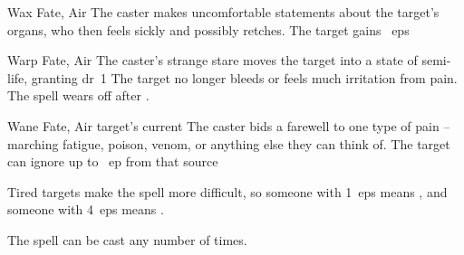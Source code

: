 \ifodd\value{diceNo}
  {}%
  {Wax}%
  {Fate, Air}%
  {}%
  {The caster makes uncomfortable statements about the target's organs, who then feels sickly and possibly retches.
  The target gains ~\glspl{ep}}%
  {}

\else

  {}%
  {Warp}%
  {Fate, Air}%
  {}%
  {The caster's strange stare moves the target into a state of semi-life, granting \gls{dr}~1}%
  {
    The target no longer bleeds or feels much irritation from pain.
    The spell wears off after .}

  {}%
  {Wane}%
  {Fate, Air}%
  {target's current }%
  {The caster bids a farewell to one type of pain -- marching fatigue, poison, venom, or anything else they can think of.
  The target can ignore up to ~\gls{ep} from that source}%
  {%
  	Tired targets make the \gls{spell} more difficult, so someone with 1~\glspl{ep} means \tn[8], and someone with 4~\glspl{ep} means \tn[11].

  	The \gls{spell} can be cast any number of times.
  }

\fi
{}
